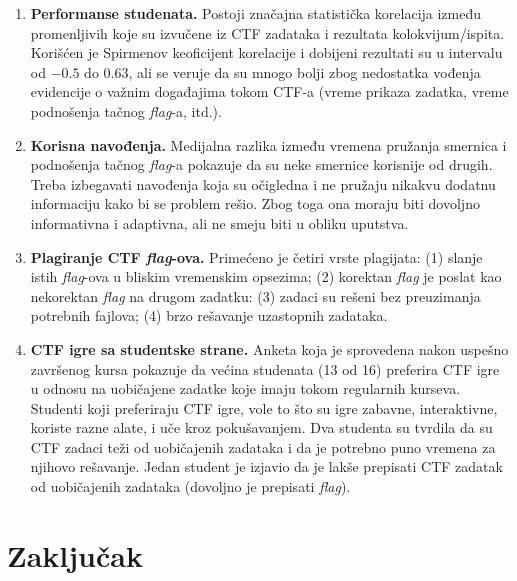 \documentclass[12pt, a4paper, twocolumn]{article}
\begin{document}
\begin{enumerate}
    \item \textbf{Performanse studenata.} Postoji značajna statistička 
        korelacija između promenljivih koje su izvučene iz CTF zadataka i 
        rezultata kolokvijum/ispita. Korišćen je Spirmenov keoficijent 
        korelacije i dobijeni rezultati su u intervalu od $-0.5$ do $0.63$, 
        ali se veruje da su mnogo bolji zbog nedostatka vođenja evidencije
        o važnim događajima tokom CTF-a (vreme prikaza zadatka, vreme 
        podnošenja tačnog \emph{flag}-a, itd.).
    \item \textbf{Korisna navođenja.} Medijalna razlika između vremena
        pružanja smernica i podnošenja tačnog \emph{flag}-a pokazuje da su
        neke smernice korisnije od drugih. Treba izbegavati navođenja koja 
        su očigledna i ne pružaju nikakvu dodatnu informaciju kako bi se 
        problem rešio. Zbog toga ona moraju biti dovoljno informativna i 
        adaptivna, ali ne smeju biti u obliku uputstva.
    \item \textbf{Plagiranje CTF \emph{flag}-ova.} Primećeno je četiri vrste
        plagijata: (1) slanje istih \emph{flag}-ova u bliskim vremenskim
        opsezima; (2) korektan \emph{flag} je poslat kao nekorektan
        \emph{flag} na drugom zadatku: (3) zadaci su rešeni bez preuzimanja
        potrebnih fajlova; (4) brzo rešavanje uzastopnih zadataka.
    \item \textbf{CTF igre sa studentske strane.} Anketa koja je sprovedena 
        nakon uspešno završenog kursa pokazuje da većina studenata (13 od 16) 
        preferira CTF igre u odnosu na uobičajene zadatke koje imaju tokom 
        regularnih kurseva. Studenti koji preferiraju CTF igre, vole to što
        su igre zabavne, interaktivne, koriste razne alate, i uče kroz 
        pokušavanjem. Dva studenta su tvrdila da su CTF zadaci teži od 
        uobičajenih zadataka i da je potrebno puno vremena za njihovo 
        rešavanje. Jedan student je izjavio da je lakše prepisati CTF zadatak
        od uobičajenih zadataka (dovoljno je prepisati \emph{flag}).
\end{enumerate}

\section{Zaključak}
\end{document}
